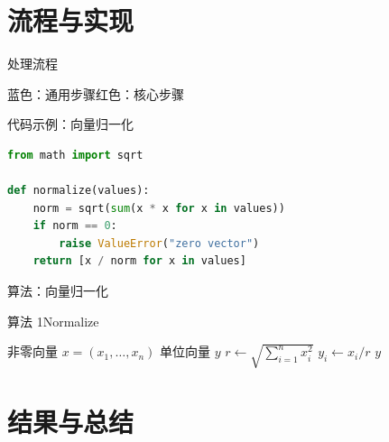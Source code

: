\documentclass[aspectratio=169,11pt,notheorems]{beamer}
\begin{document}
\section{流程与实现}

\begin{frame}{处理流程}
  \centering
  \par\bigskip
  {\small\color{Navy}蓝色：通用步骤\qquad\textcolor{Accent}{红色：核心步骤}}
\end{frame}

\begin{frame}[fragile]{代码示例：向量归一化}
\begin{lstlisting}[style=lecture,language=Python]
from math import sqrt

def normalize(values):
    norm = sqrt(sum(x * x for x in values))
    if norm == 0:
        raise ValueError("zero vector")
    return [x / norm for x in values]
\end{lstlisting}
\end{frame}

\begin{frame}{算法：向量归一化}
  \begin{block}{算法 1\quad Normalize}
    \begin{algorithmic}[1]
      \Require 非零向量 $x=(x_1,\ldots,x_n)$
      \Ensure 单位向量 $y$
      \State $r\gets\sqrt{\sum_{i=1}^{n} x_i^2}$
        \State $y_i\gets x_i/r$
      \EndFor
      \State \Return $y$
    \end{algorithmic}
  \end{block}
\end{frame}

\section{结果与总结}
\end{document}
